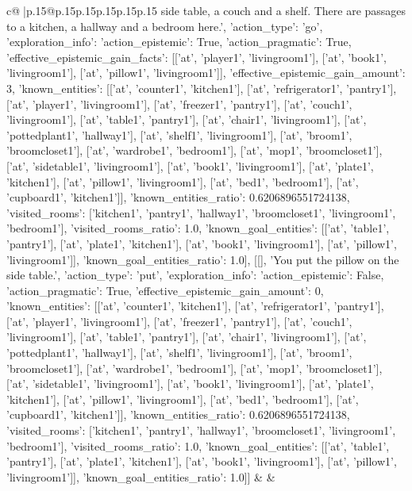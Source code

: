 \documentclass{article}
\begin{document}
{\begin{supertabular}{c@{$\;$}|p{.15\linewidth}@{}p{.15\linewidth}p{.15\linewidth}p{.15\linewidth}p{.15\linewidth}p{.15\linewidth}}
{{{side table, a couch and a shelf. There are passages to a kitchen, a hallway and a bedroom here.', {'action_type': 'go', 'exploration_info': {'action_epistemic': True, 'action_pragmatic': True, 'effective_epistemic_gain_facts': [['at', 'player1', 'livingroom1'], ['at', 'book1', 'livingroom1'], ['at', 'pillow1', 'livingroom1']], 'effective_epistemic_gain_amount': 3, 'known_entities': [['at', 'counter1', 'kitchen1'], ['at', 'refrigerator1', 'pantry1'], ['at', 'player1', 'livingroom1'], ['at', 'freezer1', 'pantry1'], ['at', 'couch1', 'livingroom1'], ['at', 'table1', 'pantry1'], ['at', 'chair1', 'livingroom1'], ['at', 'pottedplant1', 'hallway1'], ['at', 'shelf1', 'livingroom1'], ['at', 'broom1', 'broomcloset1'], ['at', 'wardrobe1', 'bedroom1'], ['at', 'mop1', 'broomcloset1'], ['at', 'sidetable1', 'livingroom1'], ['at', 'book1', 'livingroom1'], ['at', 'plate1', 'kitchen1'], ['at', 'pillow1', 'livingroom1'], ['at', 'bed1', 'bedroom1'], ['at', 'cupboard1', 'kitchen1']], 'known_entities_ratio': 0.6206896551724138, 'visited_rooms': ['kitchen1', 'pantry1', 'hallway1', 'broomcloset1', 'livingroom1', 'bedroom1'], 'visited_rooms_ratio': 1.0, 'known_goal_entities': [['at', 'table1', 'pantry1'], ['at', 'plate1', 'kitchen1'], ['at', 'book1', 'livingroom1'], ['at', 'pillow1', 'livingroom1']], 'known_goal_entities_ratio': 1.0}}], [[], 'You put the pillow on the side table.', {'action_type': 'put', 'exploration_info': {'action_epistemic': False, 'action_pragmatic': True, 'effective_epistemic_gain_amount': 0, 'known_entities': [['at', 'counter1', 'kitchen1'], ['at', 'refrigerator1', 'pantry1'], ['at', 'player1', 'livingroom1'], ['at', 'freezer1', 'pantry1'], ['at', 'couch1', 'livingroom1'], ['at', 'table1', 'pantry1'], ['at', 'chair1', 'livingroom1'], ['at', 'pottedplant1', 'hallway1'], ['at', 'shelf1', 'livingroom1'], ['at', 'broom1', 'broomcloset1'], ['at', 'wardrobe1', 'bedroom1'], ['at', 'mop1', 'broomcloset1'], ['at', 'sidetable1', 'livingroom1'], ['at', 'book1', 'livingroom1'], ['at', 'plate1', 'kitchen1'], ['at', 'pillow1', 'livingroom1'], ['at', 'bed1', 'bedroom1'], ['at', 'cupboard1', 'kitchen1']], 'known_entities_ratio': 0.6206896551724138, 'visited_rooms': ['kitchen1', 'pantry1', 'hallway1', 'broomcloset1', 'livingroom1', 'bedroom1'], 'visited_rooms_ratio': 1.0, 'known_goal_entities': [['at', 'table1', 'pantry1'], ['at', 'plate1', 'kitchen1'], ['at', 'book1', 'livingroom1'], ['at', 'pillow1', 'livingroom1']], 'known_goal_entities_ratio': 1.0}}]] 
	  } 
	   } 
	   } 
	 & & \\ 
 

    \theutterance {}  


\end{supertabular}}
\end{document}
